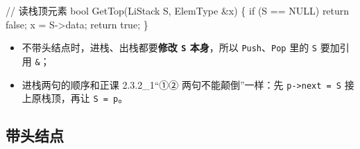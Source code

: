 \documentclass[10.5pt,a4paper,oneside]{article}
\providecommand{\tightlist}{\setlength{\itemsep}{2pt}\setlength{\parskip}{0pt}}
\newenvironment{Shaded}{}{}
\newcommand{\CommentTok}[1]{\textcolor[rgb]{0.18,0.55,0.23}{#1}}
\newcommand{\ControlFlowTok}[1]{\textcolor[rgb]{0.12,0.31,0.71}{#1}}
\newcommand{\DataTypeTok}[1]{\textcolor[rgb]{0.12,0.31,0.71}{#1}}
\newcommand{\KeywordTok}[1]{\textcolor[rgb]{0.12,0.31,0.71}{#1}}
\newcommand{\NormalTok}[1]{#1}
\newcommand{\OperatorTok}[1]{\textcolor[rgb]{0.20,0.20,0.20}{#1}}
\begin{document}
\begin{Shaded}
\begin{Highlighting}[]
\CommentTok{// 读栈顶元素}
\DataTypeTok{bool}\NormalTok{ GetTop}\OperatorTok{(}\NormalTok{LiStack S}\OperatorTok{,}\NormalTok{ ElemType }\OperatorTok{\&}\NormalTok{x}\OperatorTok{)} \OperatorTok{\{}
    \ControlFlowTok{if} \OperatorTok{(}\NormalTok{S }\OperatorTok{==}\NormalTok{ NULL}\OperatorTok{)}
        \ControlFlowTok{return} \KeywordTok{false}\OperatorTok{;}
\NormalTok{    x }\OperatorTok{=}\NormalTok{ S}\OperatorTok{{-}\textgreater{}}\NormalTok{data}\OperatorTok{;}
    \ControlFlowTok{return} \KeywordTok{true}\OperatorTok{;}
\OperatorTok{\}}
\end{Highlighting}
\end{Shaded}

\begin{itemize}
\tightlist
\item
  不带头结点时，进栈、出栈都要\textbf{修改 \texttt{S} 本身}，所以
  \texttt{Push}、\texttt{Pop} 里的 \texttt{S} 要加引用 \texttt{\&}；
\item
  进栈两句的顺序和正课 2.3.2\_1“①② 两句不能颠倒”一样：先
  \texttt{p-\textgreater{}next\ =\ S} 接上原栈顶，再让
  \texttt{S\ =\ p}。
\end{itemize}

\hypertarget{ux5e26ux5934ux7ed3ux70b9}{%
\subsection{带头结点}\label{ux5e26ux5934ux7ed3ux70b9}}
\end{document}
